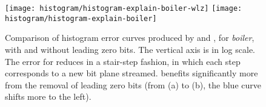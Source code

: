 \begin{figure}[h]
	\centering
	{\texttt{[image: histogram/histogram-explain-boiler-wlz]}}
	{\texttt{[image: histogram/histogram-explain-boiler]}}
	
	\caption{Comparison of histogram error curves produced by \sbit and \slvl, for \emph{boiler}, with
	and without leading zero bits. The vertical axis is in log scale. The error for \sbit reduces in a
	stair-step fashion, in which each step corresponds to a new bit plane streamed. \sbit benefits
	significantly more from the removal of leading zero bits (from (a) to (b), the blue curve shifts
	more to the left).}
	\label{fig:histogram-explain}
\end{figure}
